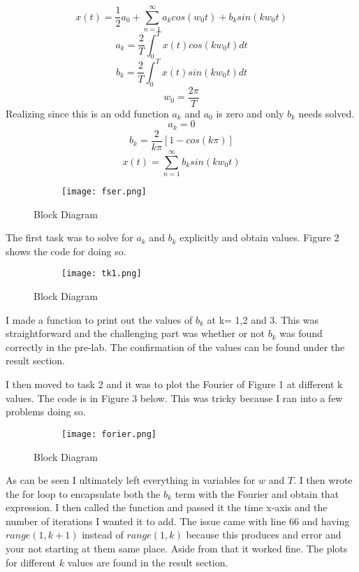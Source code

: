 \documentclass[12pt,a4paper]{article}
\begin{document}
\[x(t) = \frac{1}{2}a_0+\sum_{n=1}^{\infty}a_kcos(w_0t)+b_ksin(kw_0t)\]
\[a_k = \frac{2}{T}\int_{0}^{T}x(t)cos(kw_0t)dt\]
\[b_k = \frac{2}{T}\int_{0}^{T}x(t)sin(kw_0t)dt\]
\[w_0 = \frac{2\pi}{T}\]
Realizing since this is an odd function  $a_k$ and $a_0$ is zero and only $b_k$ needs solved. 
\[a_k = 0\]
\[b_k = \frac{2}{k\pi}[1-cos(k\pi)]\]
\[x(t) = \sum_{n=1}^{\infty}b_ksin(kw_0t)\]

 
 
 
 
 
\begin{figure}[h]
\begin{subfigure}{ 1\textwidth}
\texttt{[image: fser.png]}
\end{subfigure}
\caption{Block Diagram}
\label{fig:image2}
\end{figure}
\clearpage

The first task was to solve for $a_k$ and $b_k$ explicitly and obtain values. Figure 2 shows the code for doing so.
 
\begin{figure}[h]
\begin{subfigure}{ 1\textwidth}
\texttt{[image: tk1.png]}
\end{subfigure}
\caption{Block Diagram}
\label{fig:image2}
\end{figure}

I made a function to print out the values of $b_k$ at k=  1,2 and 3. This was straightforward and the challenging part was whether or not $b_k$ was found correctly in the pre-lab. The confirmation of the values can be found under the result section. 

I then moved to task 2 and it was to plot the Fourier of Figure 1 at different k values. The code is in Figure 3 below. This was tricky because I ran into a few problems doing so.
\clearpage
\begin{figure}[h]
\begin{subfigure}{ 1\textwidth}
\texttt{[image: forier.png]}
\end{subfigure}
\caption{Block Diagram}
\label{fig:image2}
\end{figure}

As can be seen I ultimately left everything in variables for $w$ and $T$. I then wrote the for loop to encapsulate both the $b_k$ term with the Fourier and obtain that expression. I then called the function and passed it the time x-axis and the number of iterations I wanted it to add. The issue came with line 66 and having $range(1,k+1)$ instead of $range(1,k)$ because this produces and error and your not starting at them same place. Aside from that it worked fine. The plots for different $k$ values are found in the result section.
\end{document}
